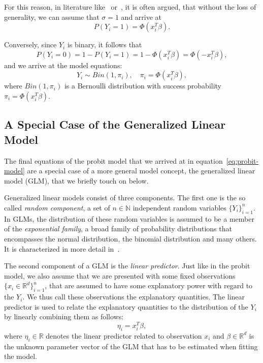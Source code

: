 For this reason, in literature like~\cite{regression-fahrmeir}
or~\cite{glm-agresti}, it is
often argued, that without the loss of generality, we can assume that
$\sigma = 1$ and arrive at
\begin{equation*}
    P(Y_i = 1) = \Phi(x_i^T \beta).
\end{equation*}

\noindent{}Conversely, since $Y_i$ is binary, it follows that
\begin{equation*}
    P(Y_i = 0) = 1 - P(Y_i = 1) = 1 - \Phi(x_i^T \beta) = \Phi(-x_i^T \beta),
\end{equation*}
and we arrive at the model equations:
\begin{equation}
    \label{eq:probit-model}
    Y_i \sim Bin(1, \pi_i), \quad \pi_i = \Phi(x_i^T \beta),
\end{equation}
where $Bin(1, \pi_i)$ is a Bernoulli distribution with success
probability $\pi_i = \Phi(x_i^T \beta)$.

\subsection{A Special Case of the Generalized Linear Model}

The final equations of the probit model that we arrived at
in equation~\ref{eq:probit-model} are a special case of a more
general model concept, the generalized linear model (GLM),
that we briefly touch on below.

Generalized linear models consist of three components.
The first one is the so called \textit{random component},
a set of $n \in \mathbb{N}$ independent random variables $\{ Y_i \}_{i=1}^n$.
In GLMs, the distribution of these random variables is assumed
to be a member of the \textit{exponential family}, a broad family of
probability distributions that encompasses the normal distribution,
the binomial distribution and many others.
It is characterized in more detail in~\cite{glm-agresti}.

The second component of a GLM is the \textit{linear predictor}.
Just like in the probit model, we also assume that we are
presented with some fixed observations $\{x_i \in \mathbb{R}^d\}_{i=1}^n$,
that are assumed to have some explanatory power with regard to
the $Y_i$. We thus call these observations the explanatory quantities.
The linear predictor is used to relate the explanatory quantities
to the distribution of the $Y_i$ by linearly combining them as follows:
\begin{equation*}
    \eta_i = x_i^T \beta,
\end{equation*}
where $\eta_i \in \mathbb{R}$ denotes the linear predictor related
to observation $x_i$ and
$\beta \in \mathbb{R}^d$ is the unknown parameter vector of the GLM
that has to be estimated when fitting the model.

